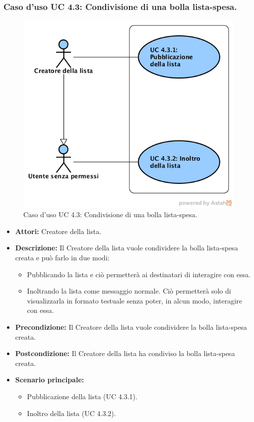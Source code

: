 \newpage
\subsubsection{Caso d'uso UC 4.3: Condivisione di una bolla lista-spesa.}
\label{Caso d'uso UC 4.3: Condivisione di una bolla lista-spesa.}
\begin{figure}[ht]
	\centering
	\includegraphics[scale=0.60]{Usecases/img/UC4.3.png}
	\caption{Caso d'uso UC 4.3: Condivisione di una bolla lista-spesa.}
\end{figure}

\FloatBarrier
\begin{itemize}
\item \textbf{Attori:} Creatore della lista.
\item \textbf{Descrizione:} Il Creatore della lista vuole condividere la bolla lista-spesa creata e può farlo in due modi:
\begin{itemize}
\item{Pubblicando la lista e ciò permetterà ai destinatari di interagire con essa.}
\item{Inoltrando la lista come messaggio normale. Ciò permetterà solo di visualizzarla in formato testuale senza poter, in alcun modo, interagire con essa.}
\end{itemize}
\item \textbf{Precondizione:} Il Creatore della lista vuole condividere la bolla lista-spesa creata. 
\item \textbf{Postcondizione:} Il Creatore della lista ha condiviso la bolla lista-spesa creata.
\item \textbf{Scenario principale:}
	\begin{itemize}
	\item{Pubblicazione della lista (UC 4.3.1).}
	\item{Inoltro della lista (UC 4.3.2).}
	\end{itemize}
\end{itemize}